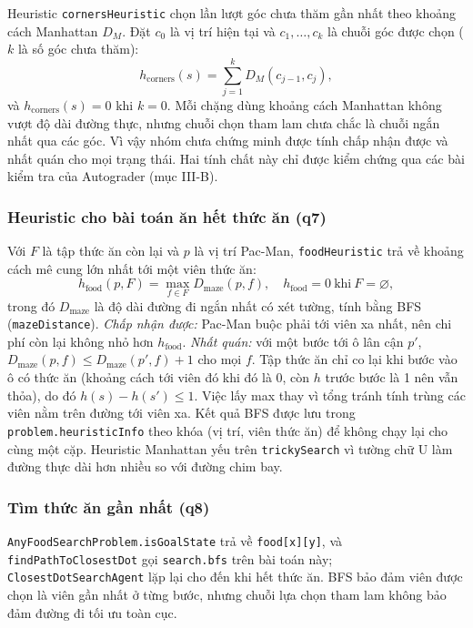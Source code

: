 \documentclass[conference]{IEEEtran}
\begin{document}
Heuristic \texttt{cornersHeuristic} chọn lần lượt góc chưa thăm gần nhất theo khoảng cách Manhattan $D_M$. Đặt $c_0$ là vị trí hiện tại và $c_1,\ldots,c_k$ là chuỗi góc được chọn ($k$ là số góc chưa thăm):
\begin{equation}
h_{\mathrm{corners}}(s)=\sum_{j=1}^{k}D_M(c_{j-1},c_j),\label{eq:corners}
\end{equation}
và $h_{\mathrm{corners}}(s)=0$ khi $k=0$. Mỗi chặng dùng khoảng cách Manhattan không vượt độ dài đường thực, nhưng chuỗi chọn tham lam chưa chắc là chuỗi ngắn nhất qua các góc. Vì vậy nhóm chưa chứng minh được tính chấp nhận được và nhất quán cho mọi trạng thái. Hai tính chất này chỉ được kiểm chứng qua các bài kiểm tra của Autograder (mục III-B).

\subsubsection{Heuristic cho bài toán ăn hết thức ăn (q7)}
Với $F$ là tập thức ăn còn lại và $p$ là vị trí Pac-Man, \texttt{foodHeuristic} trả về khoảng cách mê cung lớn nhất tới một viên thức ăn:
\begin{equation}
h_{\mathrm{food}}(p,F)=\max_{f\in F}D_{\mathrm{maze}}(p,f),\quad h_{\mathrm{food}}=0\ \text{khi}\ F=\varnothing,\label{eq:food}
\end{equation}
trong đó $D_{\mathrm{maze}}$ là độ dài đường đi ngắn nhất có xét tường, tính bằng BFS (\texttt{mazeDistance}). \emph{Chấp nhận được:} Pac-Man buộc phải tới viên xa nhất, nên chi phí còn lại không nhỏ hơn $h_{\mathrm{food}}$. \emph{Nhất quán:} với một bước tới ô lân cận $p'$, $D_{\mathrm{maze}}(p,f)\le D_{\mathrm{maze}}(p',f)+1$ cho mọi $f$. Tập thức ăn chỉ co lại khi bước vào ô có thức ăn (khoảng cách tới viên đó khi đó là 0, còn $h$ trước bước là 1 nên vẫn thỏa), do đó $h(s)-h(s')\le 1$. Việc lấy max thay vì tổng tránh tính trùng các viên nằm trên đường tới viên xa. Kết quả BFS được lưu trong \texttt{problem.heuristicInfo} theo khóa (vị trí, viên thức ăn) để không chạy lại cho cùng một cặp. Heuristic Manhattan yếu trên \texttt{trickySearch} vì tường chữ U làm đường thực dài hơn nhiều so với đường chim bay.

\subsubsection{Tìm thức ăn gần nhất (q8)}
\texttt{AnyFoodSearchProblem.isGoalState} trả về \texttt{food[x][y]}, và \texttt{findPathToClosestDot} gọi \texttt{search.bfs} trên bài toán này; \texttt{ClosestDotSearchAgent} lặp lại cho đến khi hết thức ăn. BFS bảo đảm viên được chọn là viên gần nhất ở từng bước, nhưng chuỗi lựa chọn tham lam không bảo đảm đường đi tối ưu toàn cục.
\end{document}
